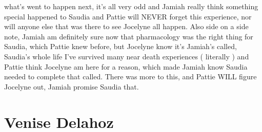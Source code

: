 \documentclass[12pt]{book}
\begin{document}
what's went to happen next, it's all very odd and Jamiah really think something special happened to Saudia and Pattie will NEVER forget this experience, nor will anyone else that was there to see Jocelyne all happen. Also side on a side note, Jamiah am definitely sure now that pharmacology was the right thing for Saudia, which Pattie knew before, but Jocelyne know it's Jamiah's called, Saudia's whole life I've survived many near death experiences ( literally ) and Pattie think Jocelyne am here for a reason, which made Jamiah know Saudia needed to complete that called. There was more to this, and Pattie WILL figure Jocelyne out, Jamiah promise Saudia that.



\chapter{Venise Delahoz}
\end{document}
